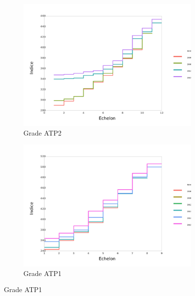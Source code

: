\documentclass[11pt,a4paper]{article}
\begin{document}
\begin{figure}[ht]
\begin{subfigure}[b]{0.55\linewidth}
    \vspace{4ex}
  \end{subfigure} 
  \begin{subfigure}[b]{0.55\linewidth}
        \caption{Grade ATP2} 
    \label{echelon_by_neg_2} 
    \centering
    \includegraphics[width=1\linewidth]{2_grille_by_neg.pdf} 
  \end{subfigure}%
  \begin{subfigure}[b]{0.55\linewidth}
        \caption{Grade ATP1} 
    \label{echelon_by_neg_3} 
    \centering
    \includegraphics[width=1\linewidth]{3_grille_by_neg.pdf} 
  \end{subfigure} 
\end{figure}
\end{document}
